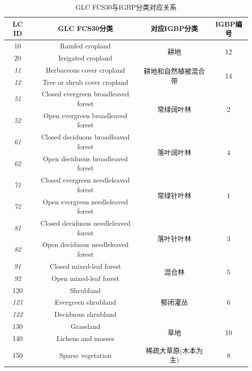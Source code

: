 \begin{table}[htbp]
\fontsize{9.5}{9.5}\selectfont
\renewcommand\arraystretch{1.85}
\centering
\caption{GLC FCS30与IGBP分类对应关系}
\label{tab:GLC FCS30与IGBP分类对应关系}
\begin{tabular}{cccc}
\toprule
LC ID & GLC FCS30分类 & 对应IGBP分类 & IGBP编号 \\
%
\midrule
 10 & Rainfed cropland & \multirow{2}{*}{耕地} & \multirow{2}{*}{12} \\
  20 & Irrigated cropland & & \\
%
\cline{1-4}  \textit{11} & Herbaceous cover cropland & \multirow{2}{*}{耕地和自然植被混合带} & \multirow{2}{*}{14} \\
  \textit{12} & Tree or shrub cover cropland & & \\
%
\cline{1-4}  \textit{51} & Closed evergreen broadleaved forest & \multirow{2}{*}{常绿阔叶林} & \multirow{2}{*}{2} \\
  \textit{52} & Open evergreen broadleaved forest & & \\
%
\cline{1-4}  \textit{61} & Closed deciduous broadleaved forest & \multirow{2}{*}{落叶阔叶林} & \multirow{2}{*}{4} \\
  \textit{62} & Open deciduous broadleaved forest & & \\
%
\cline{1-4}  \textit{71} & Closed evergreen needleleaved forest & \multirow{2}{*}{常绿针叶林} & \multirow{2}{*}{1} \\
  \textit{72} & Open evergreen needleleaved forest & & \\
%
\cline{1-4}  \textit{81} & Closed deciduous needleleaved forest & \multirow{2}{*}{落叶针叶林} & \multirow{2}{*}{3} \\
  \textit{82} & Open deciduous needleleaved forest & & \\
%
\cline{1-4}  \textit{91} & Closed mixed-leaf forest & \multirow{2}{*}{混合林} & \multirow{2}{*}{5} \\
  \textit{92} & Open mixed-leaf forest & & \\
%
\cline{1-4} 120 & Shrubland & \multirow{3}{*}{郁闭灌丛} & \multirow{3}{*}{6} \\
 \textit{121} & Evergreen shrubland & & \\
 \textit{122} & Deciduous shrubland & & \\
%
\cline{1-4} 130 & Grassland & \multirow{2}{*}{草地} & \multirow{2}{*}{10} \\
 140 & Lichens and mosses & & \\
%
\cline{1-4} 150 & Sparse vegetation & 稀疏大草原(木本为主) & 8 \\

\end{tabular}
\end{table}
